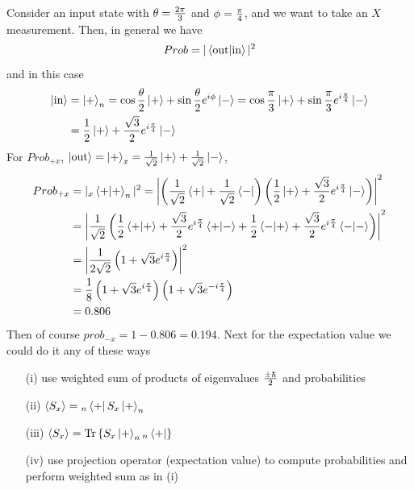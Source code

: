 \documentclass[english, 11pt]{article}
\begin{document}
     \begin{exmp}
       Consider an input state with $\theta = \frac{2\pi}{3}$ and $\phi = \frac{\pi}{4}$, and we want to take an $X$ measurement. Then, in general we have
       \[ Prob = |\braket{\mbox{out}}{\mbox{in}}|^2 \]
       and in this case
       \begin{align*}
           \left|\mbox{in}\right\rangle & = \left|+\right\rangle_n = \cos\frac{\theta}{2}\left|+\right\rangle + \sin\frac{\theta}{2}e^{i\phi}\left|-\right\rangle = \cos\frac{\pi}{3}\left|+\right\rangle + \sin\frac{\pi}{3}e^{i\frac{\pi}{4}}\left|-\right\rangle \\
                           & = \frac{1}{2}\left|+\right\rangle + \frac{\sqrt{3}}{2}e^{i\frac{\pi}{4}}\left|-\right\rangle
       \end{align*}
       For $Prob_{+x}$, $\left|\mbox{out}\right\rangle = \left|+\right\rangle_x = \frac{1}{\sqrt{2}} \left|+\right\rangle + \frac{1}{\sqrt{2}}\left|-\right\rangle$,
       \begin{align*}
         Prob_{+x} & = |{}_x\braket{+}{+}_n|^2 = \left| \left( \f{1}{\sqrt{2}}\bp + \f{1}{\sqrt{2}}\bm \right)\left( \f{1}{2}\kp + \f{\sqrt{3}}{2}e^{i\f{\pi}{4}}\km \right) \right|^2 \\
         & = \left| \f{1}{\sqrt{2}} \left( \f{1}{2}\braket{+}{+} + \f{\sqrt{3}}{2}e^{i\f{\pi}{4}}\braket{+}{-} + \f{1}{2}\braket{-}{+} + \f{\sqrt{3}}{2}e^{i\f{\pi}{4}}\braket{-}{-} \right) \right|^2 \\
         & = \left| \f{1}{2\sqrt{2}} \left( 1 + \sqrt{3}e^{i\f{\pi}{4}} \right) \right|^2 \\
         & = \f{1}{8} \left( 1 + \sqrt{3}e^{i\f{\pi}{4}} \right) \left( 1 + \sqrt{3}e^{-i\f{\pi}{4}} \right) \\
         & = 0.806
       \end{align*}
       Then of course $prob_{-x} = 1 - 0.806 = 0.194$. Next for the expectation value we could do it any of these ways
       \begin{itemize}
         \item[(i)] use weighted sum of products of eigenvalues $\frac{\pm\hbar}{2}$ and probabilities
         \item[(ii)] $\langle S_x \rangle = {}_n\left\langle+\right| S_x \left|+\right\rangle_n$
         \item[(iii)] $\langle S_x \rangle = \mbox{Tr}\left\{ S_x \left|+\right\rangle_n{}_n\left\langle+\right| \right\}$
         \item[(iv)] use projection operator (expectation value) to compute probabilities and perform weighted sum as in (i)
       \end{itemize}
     \end{exmp}
\end{document}

